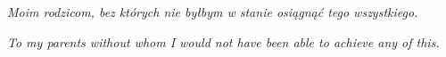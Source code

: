 
\begin{dedication} 

\emph{Moim rodzicom, bez których nie byłbym w stanie osiągnąć tego
  wszystkiego.}

\emph{To my parents without whom I would not have been able to achieve
  any of this.}
  
\end{dedication}

